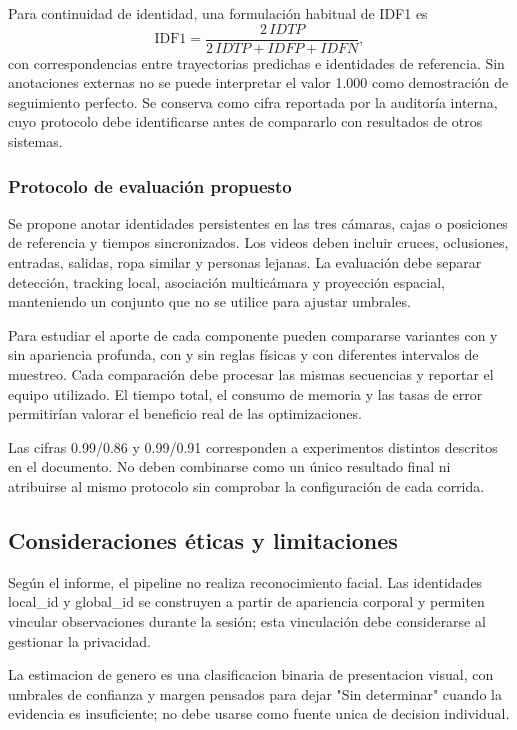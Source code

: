 \documentclass[12pt,letterpaper]{article}
\begin{document}
Para continuidad de identidad, una formulación habitual de IDF1 es
\[
 \mathrm{IDF1}=\frac{2\,IDTP}{2\,IDTP+IDFP+IDFN},
\]
con correspondencias entre trayectorias predichas e identidades de referencia. Sin anotaciones externas no se puede interpretar el valor 1.000 como demostración de seguimiento perfecto. Se conserva como cifra reportada por la auditoría interna, cuyo protocolo debe identificarse antes de compararlo con resultados de otros sistemas.

\subsubsection{Protocolo de evaluación propuesto}
Se propone anotar identidades persistentes en las tres cámaras, cajas o posiciones de referencia y tiempos sincronizados. Los videos deben incluir cruces, oclusiones, entradas, salidas, ropa similar y personas lejanas. La evaluación debe separar detección, tracking local, asociación multicámara y proyección espacial, manteniendo un conjunto que no se utilice para ajustar umbrales.

Para estudiar el aporte de cada componente pueden compararse variantes con y sin apariencia profunda, con y sin reglas físicas y con diferentes intervalos de muestreo. Cada comparación debe procesar las mismas secuencias y reportar el equipo utilizado. El tiempo total, el consumo de memoria y las tasas de error permitirían valorar el beneficio real de las optimizaciones.

Las cifras 0.99/0.86 y 0.99/0.91 corresponden a experimentos distintos descritos en el documento. No deben combinarse como un único resultado final ni atribuirse al mismo protocolo sin comprobar la configuración de cada corrida.


\subsection{Consideraciones éticas y limitaciones}

Según el informe, el pipeline no realiza reconocimiento facial. Las identidades local\_id y global\_id se construyen a partir de apariencia corporal y permiten vincular observaciones durante la sesión; esta vinculación debe considerarse al gestionar la privacidad.


La estimacion de genero es una clasificacion binaria de presentacion visual, con umbrales de confianza y margen pensados para dejar "Sin determinar" cuando la evidencia es insuficiente; no debe usarse como fuente unica de decision individual.
\end{document}

